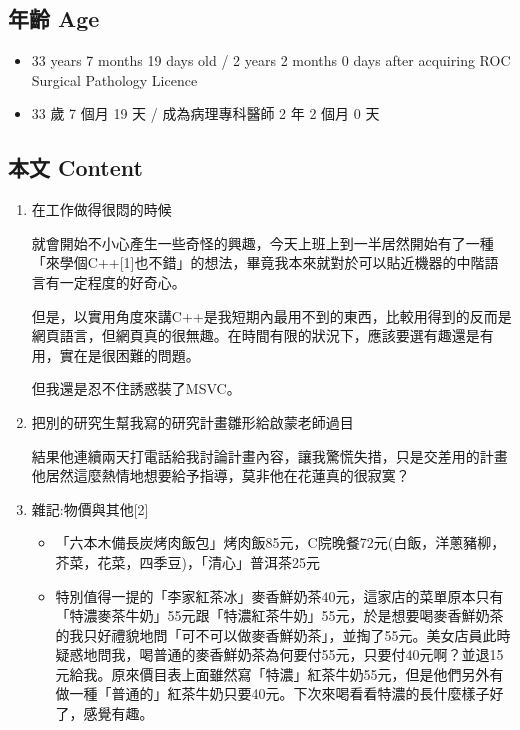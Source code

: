\documentclass[a5paper, 12pt
]{book}
\providecommand{\tightlist}{%
  \setlength{\itemsep}{0pt}\setlength{\parskip}{0pt}}
\begin{document}
\hypertarget{ux5e74ux9f61-age-11}{%
\subsection{年齡 Age}\label{ux5e74ux9f61-age-11}}

\begin{itemize}
\tightlist
\item
  33 years 7 months 19 days old / 2 years 2 months 0 days after
  acquiring ROC Surgical Pathology Licence
\item
  33 歲 7 個月 19 天 / 成為病理專科醫師 2 年 2 個月 0 天
\end{itemize}

\hypertarget{ux672cux6587-content-11}{%
\subsection{本文 Content}\label{ux672cux6587-content-11}}

\begin{enumerate}
\def\labelenumi{\arabic{enumi}.}
\item
  在工作做得很悶的時候

  就會開始不小心產生一些奇怪的興趣，今天上班上到一半居然開始有了一種「來學個C++{[}1{]}也不錯」的想法，畢竟我本來就對於可以貼近機器的中階語言有一定程度的好奇心。

  但是，以實用角度來講C++是我短期內最用不到的東西，比較用得到的反而是網頁語言，但網頁真的很無趣。在時間有限的狀況下，應該要選有趣還是有用，實在是很困難的問題。

  但我還是忍不住誘惑裝了MSVC。
\item
  把別的研究生幫我寫的研究計畫雛形給啟蒙老師過目

  結果他連續兩天打電話給我討論計畫內容，讓我驚慌失措，只是交差用的計畫他居然這麼熱情地想要給予指導，莫非他在花蓮真的很寂寞？
\item
  雜記:物價與其他{[}2{]}

  \begin{itemize}
  \tightlist
  \item
    「六本木備長炭烤肉飯包」烤肉飯85元，C院晚餐72元(白飯，洋蔥豬柳，芥菜，花菜，四季豆)，「清心」普洱茶25元
  \item
    特別值得一提的「李家紅茶冰」麥香鮮奶茶40元，這家店的菜單原本只有「特濃麥茶牛奶」55元跟「特濃紅茶牛奶」55元，於是想要喝麥香鮮奶茶的我只好禮貌地問「可不可以做麥香鮮奶茶」，並掏了55元。美女店員此時疑惑地問我，喝普通的麥香鮮奶茶為何要付55元，只要付40元啊？並退15元給我。原來價目表上面雖然寫「特濃」紅茶牛奶55元，但是他們另外有做一種「普通的」紅茶牛奶只要40元。下次來喝看看特濃的長什麼樣子好了，感覺有趣。
  \end{itemize}
\end{enumerate}
\end{document}
